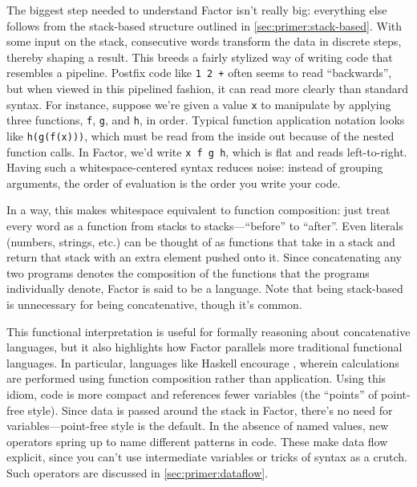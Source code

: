 The biggest step needed to understand Factor isn't really big: everything else
follows from the stack-based structure outlined in
\cref{sec:primer:stack-based}.  With some input on the stack, consecutive words
transform the data in discrete steps, thereby shaping a result.  This breeds a
fairly stylized way of writing code that resembles a pipeline.  Postfix code
like \texttt{1 2 +} often seems to read ``backwards'', but when viewed in this
pipelined fashion, it can read more clearly than standard syntax.  For
instance, suppose we're given a value \texttt{x} to manipulate by applying
three functions, \texttt{f}, \texttt{g}, and \texttt{h}, in order.  Typical
function application notation looks like \texttt{h(g(f(x)))}, which must be
read from the inside out because of the nested function calls.  In Factor, we'd
write \texttt{x f g h}, which is flat and reads left-to-right.  Having such a
whitespace-centered syntax reduces noise: instead of grouping arguments, the
order of evaluation is the order you write your code.

In a way, this makes whitespace equivalent to function composition: just treat
every word as a function from stacks to stacks---``before'' to ``after''.  Even
literals (numbers, strings, etc.) can be thought of as functions that take in a
stack and return that stack with an extra element pushed onto it.  Since
concatenating any two programs denotes the composition of the functions that
the programs individually denote, Factor is said to be a 
language.  Note that being stack-based is
unnecessary for being concatenative, though it's common.

This functional interpretation is useful for formally reasoning about
concatenative languages, but it also highlights how Factor
parallels more traditional functional languages.  In particular, languages like
Haskell encourage , wherein calculations are performed
using function composition rather than application.  Using this
idiom, code is more compact and references fewer variables (the ``points'' of
point-free style).  Since data is passed around the stack in Factor, there's no
need for variables---point-free style is the default.  In the absence of named
values, new operators spring up to name different patterns in code.  These make
data flow explicit, since you can't use intermediate variables or tricks of
syntax as a crutch.  Such operators are discussed in
\cref{sec:primer:dataflow}.

